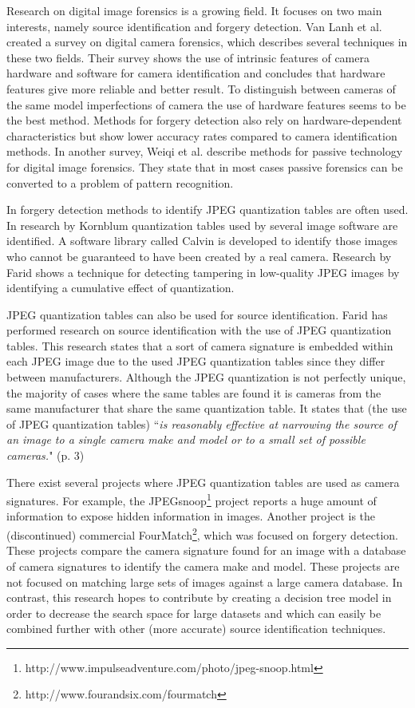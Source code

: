 Research on digital image forensics is a growing field. It focuses on two main interests, namely source identification and forgery detection. Van Lanh et al. \cite{van2007survey} created a survey on digital camera forensics, which describes several techniques in these two fields. Their survey shows the use of intrinsic features of camera hardware and software for camera identification and concludes that hardware features give more reliable and better result. To distinguish between cameras of the same model imperfections of camera the use of hardware features seems to be the best method. Methods for forgery detection also rely on hardware-dependent characteristics but show lower accuracy rates compared to camera identification methods. In another survey, Weiqi et al. \cite{luo2007survey} describe methods for passive technology for digital image forensics. They state that in most cases passive forensics can be converted to a problem of pattern recognition.

In forgery detection methods to identify JPEG quantization tables are often used. In research by Kornblum\cite{kornblum2008using} quantization tables used by several image software are identified. A software library called Calvin is developed to identify those images who cannot
be guaranteed to have been created by a real camera. Research by Farid\cite{4773149} shows a technique for detecting tampering in low-quality JPEG images by identifying a cumulative effect of quantization.

JPEG quantization tables can also be used for source identification. Farid has performed research\cite{farid1}\cite{farid2008digital} on source identification with the use of JPEG quantization tables. This research states that a sort of camera signature is embedded within each JPEG image due to the used JPEG quantization tables since they differ between manufacturers. Although the JPEG quantization is not perfectly unique, the majority of cases where the same tables are found it is cameras from the same manufacturer that share the same quantization table. It states that (the use of JPEG quantization tables) ``\textit{is reasonably effective at narrowing the source of an image to a single camera make and model or to a small set of possible cameras.}" (p. 3)

There exist several projects where JPEG quantization tables are used as camera signatures. For example, the JPEGsnoop\footnote{http://www.impulseadventure.com/photo/jpeg-snoop.html} project reports a huge amount of information to expose hidden information in images. Another project is the (discontinued) commercial FourMatch\footnote{http://www.fourandsix.com/fourmatch}, which was focused on forgery detection. These projects compare the camera signature found for an image with a database of camera signatures to identify the camera make and model. These projects are not focused on matching large sets of images against a large camera database. In contrast, this research hopes to contribute by creating a decision tree model in order to decrease the search space for large datasets and which can easily be combined further with other (more accurate) source identification techniques. 

